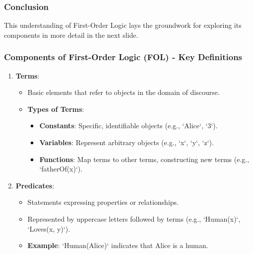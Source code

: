 \documentclass[aspectratio=169]{beamer}
\begin{document}
\begin{frame}[fragile]
    \frametitle{Conclusion}
    This understanding of First-Order Logic lays the groundwork for exploring its components in more detail in the next slide.
\end{frame}

\begin{frame}[fragile]
  \frametitle{Components of First-Order Logic (FOL) - Key Definitions}
  \begin{enumerate}
    \item \textbf{Terms}:
      \begin{itemize}
        \item Basic elements that refer to objects in the domain of discourse.
        \item \textbf{Types of Terms}:
          \begin{itemize}
            \item \textbf{Constants}: Specific, identifiable objects (e.g., `Alice`, `3`).
            \item \textbf{Variables}: Represent arbitrary objects (e.g., `x`, `y`, `z`).
            \item \textbf{Functions}: Map terms to other terms, constructing new terms (e.g., `fatherOf(x)`).
          \end{itemize}
      \end{itemize}
    
    \item \textbf{Predicates}:
      \begin{itemize}
        \item Statements expressing properties or relationships.
        \item Represented by uppercase letters followed by terms (e.g., `Human(x)`, `Loves(x, y)`).
        \item \textbf{Example}: `Human(Alice)` indicates that Alice is a human.
      \end{itemize}
  \end{enumerate}
\end{frame}
\end{document}
